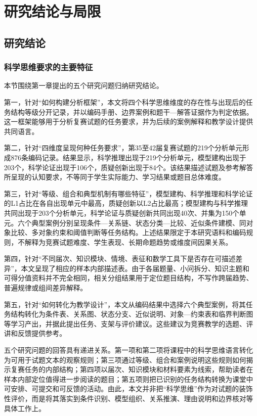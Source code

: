 \documentclass[
  12pt,
  a4paper]{ctexbook}
\begin{document}
\chapter{研究结论与局限}\label{ux7814ux7a76ux7ed3ux8bbaux4e0eux5c40ux9650}

\section{研究结论}\label{ux7814ux7a76ux7ed3ux8bba}

\subsection{科学思维要求的主要特征}\label{ux79d1ux5b66ux601dux7ef4ux8981ux6c42ux7684ux4e3bux8981ux7279ux5f81}

本节围绕第一章提出的五个研究问题归纳研究结论。

第一，针对``如何构建分析框架''，本文将四个科学思维维度的存在性与出现后的任务结构等级分开记录，并以编码手册、边界案例和题干---解答证据作为判定依据。这一框架能够用于分析复赛试题的任务要求，并为后续的案例解释和教学设计提供共同语言。

第二，针对``四维度呈现何种任务要求''，第35至42届复赛试题的219个分析单元形成876条编码记录。结果显示，科学推理出现于219个分析单元，模型建构出现于203个，科学论证出现于106个，质疑创新出现于84个。该结果描述试题及参考解答所呈现的认知要求，不等同于学生实际能力、学习结果或题目总体难度。

第三，针对``等级、组合和典型机制有哪些特征''，模型建构、科学推理和科学论证的L1占比在各自出现单元中最高，质疑创新以L2占比最高；模型建构与科学推理共同出现于203个分析单元，科学论证与质疑创新共同出现40次、并集为150个单元。六个典型案例分别呈现条件---关系链、状态分类---比较、近似条件建模、同对象比较、多对象约束和阈值判断等任务结构。上述结果限定于本研究语料和编码规则，不解释为竞赛试题难度、学生表现、长期命题趋势或维度间因果关系。

第四，针对``不同届次、知识模块、情境、表征和数学工具下是否存在可描述差异''，本文呈现了相应的样本内部描述表。由于各届题量、小问拆分、知识主题和可得分值资料并不完全相同，相关分组结果用于定位题目结构，不写作跨届趋势、普遍规律或组间差异解释。

第五，针对``如何转化为教学设计''，本文从编码结果中选择六个典型案例，将其任务结构转化为条件表、关系图、状态分支、近似说明、对象---约束表和临界判断图等学习产出，并据此提出任务、支架与评价建议。这些建议为竞赛教学的选题、评讲和反馈提供参考。

五个研究问题的回答具有递进关系。第一项和第二项将课程中的科学思维语言转化为可用于试题文本的观察规则；第三项通过等级、组合和案例说明这些规则如何揭示复赛任务的内部结构；第四项以届次、知识模块和材料要素为线索，帮助读者在样本内部定位值得进一步阅读的题目；第五项则把已识别的任务结构转换为课堂中可安排、可提交和可反馈的活动。由此，本文并非把``科学思维''作为对试题的装饰性评价，而是将其落实到条件识别、模型组织、关系推演、理由说明和边界核对等具体工作上。
\end{document}
